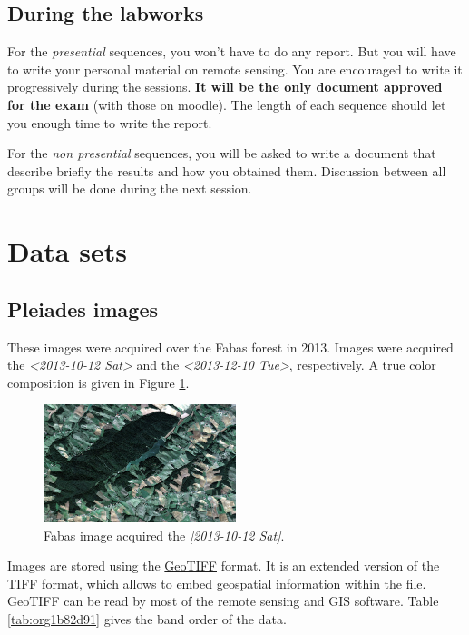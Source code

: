 \documentclass[a4paper,11pt,DIV=18]{scrartcl}
\begin{document}
\subsection{During the labworks}
\label{sec:org15a2f24}
For the \emph{presential} sequences, you won't have to do any report. But you
will have to  write your personal material on remote  sensing. You are
encouraged to write it progressively  during the sessions.  \textbf{It will be
the only  document approved for the  exam} (with those on  moodle). The
length  of each  sequence  should let  you enough  time  to write  the
report.

For  the \emph{non  presential}  sequences,  you will  be  asked  to write  a
document  that  describe briefly  the  results  and how  you  obtained
them.  Discussion between  all groups  will  be done  during the  next
session.
\section{Data sets}
\label{sec:orgdeca9ca}
\subsection{Pleiades images}
\label{sec:orgd996493}
These images were acquired over the  Fabas forest in 2013. Images were
acquired   the   \textit{<2013-10-12 Sat>    }    and   the   \textit{<2013-12-10 Tue>},
respectively. A true color composition is given in Figure \ref{fig:orgd82a81b}.

\begin{figure}[htbp]
\centering
\includegraphics[width=0.5\textwidth]{./figures/quicklook_fabas_12_10_2013.jpg}
\caption{\label{fig:orgd82a81b}
Fabas image acquired the \textit{[2013-10-12 Sat]}.}
\end{figure}

Images are stored using the \href{https://trac.osgeo.org/geotiff/}{GeoTIFF} format.  It is an extended version
of  the TIFF  format,  which allows  to  embed geospatial  information
within the file. GeoTIFF can be read by most of the remote sensing and
GIS software. Table \ref{tab:org1b82d91} gives the band order of the data.
\end{document}
